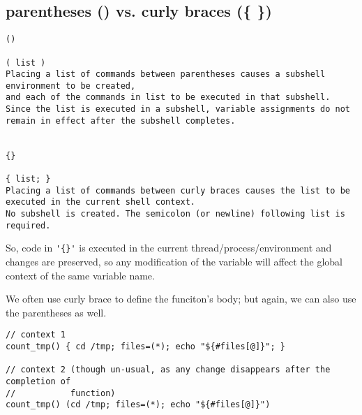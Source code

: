 % 
% 


\subsection{parentheses () vs. curly braces (\{ \})}


\begin{verbatim}
()

( list )
Placing a list of commands between parentheses causes a subshell environment to be created, 
and each of the commands in list to be executed in that subshell. 
Since the list is executed in a subshell, variable assignments do not remain in effect after the subshell completes.


{}

{ list; }
Placing a list of commands between curly braces causes the list to be executed in the current shell context. 
No subshell is created. The semicolon (or newline) following list is required.
\end{verbatim}

So, code in \verb!'{}'! is executed in the current thread/process/environment
and changes are preserved, so any modification of the variable will affect the
global context of the same variable name.

We often use curly brace to define the funciton's body; but again, we can also
use the parentheses as well.
\begin{verbatim}
// context 1
count_tmp() { cd /tmp; files=(*); echo "${#files[@]}"; }

// context 2 (though un-usual, as any change disappears after the completion of
//           function)
count_tmp() (cd /tmp; files=(*); echo "${#files[@]}")
\end{verbatim}


